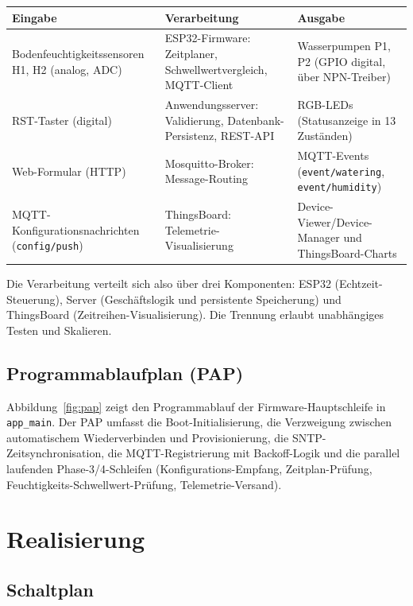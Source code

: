 \documentclass[a4paper,12pt]{article}
\begin{document}
\begin{center}
\begin{tabular}{p{}p{}p{}}
\hline
\textbf{Eingabe} & \textbf{Verarbeitung} & \textbf{Ausgabe} \\
\hline
Bodenfeuchtigkeitssensoren H1, H2 (analog, ADC) &
ESP32-Firmware: Zeitplaner, Schwellwertvergleich, MQTT-Client &
Wasserpumpen P1, P2 (GPIO digital, über NPN-Treiber) \\
\hline
RST-Taster (digital) &
Anwendungsserver: Validierung, Datenbank-Persistenz, REST-API &
RGB-LEDs (Statusanzeige in 13 Zuständen) \\
\hline
Web-Formular (HTTP) &
Mosquitto-Broker: Message-Routing &
MQTT-Events (\texttt{event/watering}, \texttt{event/humidity}) \\
\hline
MQTT-Konfigurationsnachrichten (\texttt{config/push}) &
ThingsBoard: Telemetrie-Visualisierung &
Device-Viewer/Device-Manager und ThingsBoard-Charts \\
\hline
\end{tabular}
\end{center}

Die Verarbeitung verteilt sich also über drei Komponenten: ESP32
(Echtzeit-Steuerung), Server (Geschäftslogik und persistente Speicherung)
und ThingsBoard (Zeitreihen-Visualisierung). Die Trennung erlaubt
unabhängiges Testen und Skalieren.

\subsection{Programmablaufplan (PAP)}

Abbildung~\ref{fig:pap} zeigt den Programmablauf der Firmware-Hauptschleife
in \texttt{app\_main}. Der PAP umfasst die Boot-Initialisierung, die
Verzweigung zwischen automatischem Wiederverbinden und
Provisionierung, die SNTP-Zeitsynchronisation, die
MQTT-Registrierung mit Backoff-Logik und die parallel laufenden
Phase-3/4-Schleifen (Konfigurations-Empfang, Zeitplan-Prüfung,
Feuchtigkeits-Schwellwert-Prüfung, Telemetrie-Versand).

\section{Realisierung}

\subsection{Schaltplan}
\label{sec:schaltplan}
\end{document}
